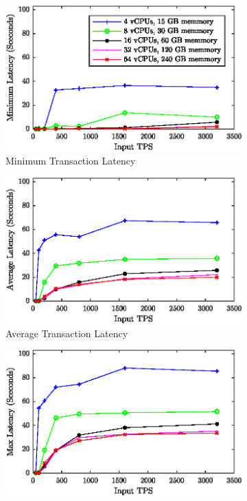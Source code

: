 \documentclass[conference]{IEEEtran}
\begin{document}
\begin{figure}[h]
\centering
\begin{subfigure}{0.95\columnwidth}
\includegraphics[width=\columnwidth]{figs/min.eps}%
\caption{Minimum Transaction Latency}%
\label{latency_min}%
\end{subfigure}\hfill%
\begin{subfigure}{0.95\columnwidth}
\includegraphics[width=\columnwidth]{figs/avg.eps}%
\caption{Average Transaction Latency}%
\label{latency_avg}%
\end{subfigure}\hfill%
\begin{subfigure}{0.95\columnwidth}
\includegraphics[width=\columnwidth]{figs/max.eps}%

\end{subfigure}
\end{figure}
\end{document}
